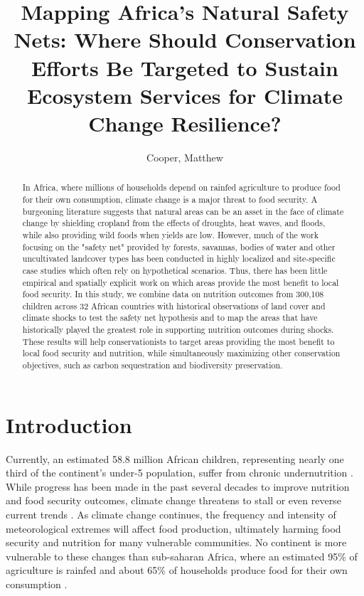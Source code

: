 \documentclass{article}
\begin{document}
\title{Mapping Africa's Natural Safety Nets: Where Should Conservation Efforts Be Targeted to Sustain Ecosystem Services for Climate Change Resilience?}

\author{
	Cooper, Matthew\\
}

\maketitle
\begin{abstract}

In Africa, where millions of households depend on rainfed agriculture to produce food for their own consumption, climate change is a major threat to food security.  A burgeoning literature suggests that natural areas can be an asset in the face of climate change by shielding cropland from the effects of droughts, heat waves, and floods, while also providing wild foods when yields are low.  However, much of the work focusing on the "safety net" provided by forests, savannas, bodies of water and other uncultivated landcover types has been conducted in highly localized and site-specific case studies which often rely on hypothetical scenarios.  Thus, there has been little empirical and spatially explicit work on which areas provide the most benefit to local food security.  In this study, we combine data on nutrition outcomes from  300,108 children across 32 African countries with historical observations of land cover and climate shocks to test the safety net hypothesis and to map the areas that have historically played the greatest role in supporting nutrition outcomes during shocks.  These results will help conservationists to target areas providing the most benefit to local food security and nutrition, while simultaneously maximizing other conservation objectives, such as carbon sequestration and biodiversity preservation.

\end{abstract}

\section{Introduction}

Currently, an estimated 58.8 million African children, representing nearly one third of the continent's under-5 population, suffer from chronic undernutrition \cite{unicef2019}.  While progress has been made in the past several decades to improve nutrition and food security outcomes, climate change threatens to stall or even reverse current trends \cite{FAO2018}.  As climate change continues, the frequency and intensity of meteorological extremes will affect food production, ultimately harming food security and nutrition for many vulnerable communities.  No continent is more vulnerable to these changes than sub-saharan Africa, where an estimated 95\% of agriculture is rainfed \cite{Wani2009} and about 65\% of households  produce food for their own consumption \cite{Runge2004}.
\end{document}
